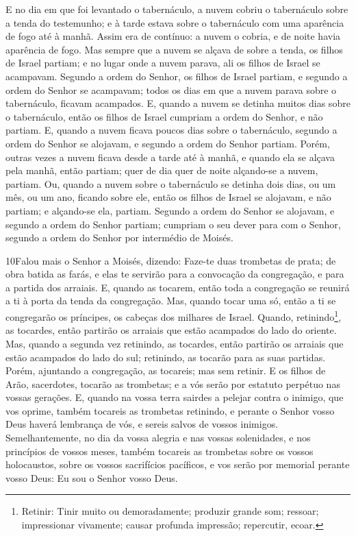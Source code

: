 E no dia em que foi levantado o tabernáculo, a nuvem cobriu o
tabernáculo sobre a tenda do testemunho; e à tarde estava sobre o
tabernáculo com uma aparência de fogo até à manhã. Assim era
de contínuo: a nuvem o cobria, e de noite havia aparência de fogo.
Mas sempre que a nuvem se alçava de sobre a tenda, os filhos
de Israel partiam; e no lugar onde a nuvem parava, ali os filhos de
Israel se acampavam. Segundo a ordem do Senhor, os filhos de
Israel partiam, e segundo a ordem do Senhor se acampavam; todos os
dias em que a nuvem parava sobre o tabernáculo, ficavam acampados.
E, quando a nuvem se detinha muitos dias sobre o tabernáculo,
então os filhos de Israel cumpriam a ordem do Senhor, e não partiam.
E, quando a nuvem ficava poucos dias sobre o tabernáculo,
segundo a ordem do Senhor se alojavam, e segundo a ordem do Senhor
partiam. Porém, outras vezes a nuvem ficava desde a tarde até
à manhã, e quando ela se alçava pela manhã, então partiam; quer de
dia quer de noite alçando-se a nuvem, partiam. Ou, quando a
nuvem sobre o tabernáculo se detinha dois dias, ou um mês, ou um
ano, ficando sobre ele, então os filhos de Israel se alojavam, e não
partiam; e alçando-se ela, partiam. Segundo a ordem do Senhor
se alojavam, e segundo a ordem do Senhor partiam; cumpriam o seu
dever para com o Senhor, segundo a ordem do Senhor por intermédio de
Moisés.

\medskip

\lettrine{10} Falou mais o Senhor a Moisés, dizendo:
Faze-te duas trombetas de prata; de obra batida as farás, e elas
te servirão para a convocação da congregação, e para a partida dos
arraiais. E, quando as tocarem, então toda a congregação se
reunirá a ti à porta da tenda da congregação. Mas, quando tocar
uma só, então a ti se congregarão os príncipes, os cabeças dos
milhares de Israel. Quando, retinindo\footnote{Retinir: Tinir
muito ou demoradamente; produzir grande som; ressoar; impressionar
vivamente; causar profunda impressão; repercutir, ecoar.}, as
tocardes, então partirão os arraiais que estão acampados do lado do
oriente. Mas, quando a segunda vez retinindo, as tocardes, então
partirão os arraiais que estão acampados do lado do sul; retinindo,
as tocarão para as suas partidas. Porém, ajuntando a
congregação, as tocareis; mas sem retinir. E os filhos de Arão,
sacerdotes, tocarão as trombetas; e a vós serão por estatuto
perpétuo nas vossas gerações. E, quando na vossa terra sairdes a
pelejar contra o inimigo, que vos oprime, também tocareis as
trombetas retinindo, e perante o Senhor vosso Deus haverá lembrança
de vós, e sereis salvos de vossos inimigos. Semelhantemente,
no dia da vossa alegria e nas vossas solenidades, e nos princípios
de vossos meses, também tocareis as trombetas sobre os vossos
holocaustos, sobre os vossos sacrifícios pacíficos, e vos serão por
memorial perante vosso Deus: Eu sou o Senhor vosso Deus.

